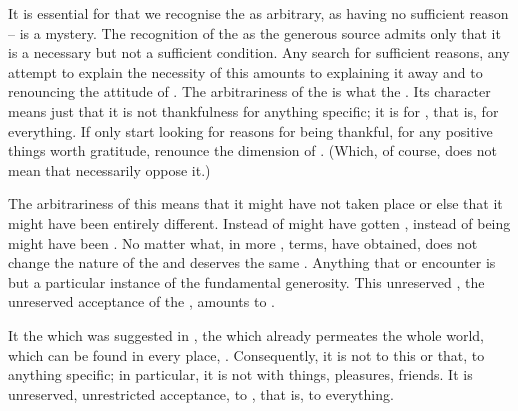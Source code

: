It is essential for  that we recognise
the  as arbitrary, as having no sufficient reason --
 is a mystery.  The recognition of the  as the
generous source admits only that it is a necessary but not a
sufficient condition.  Any search for sufficient reasons, any attempt
to explain the necessity of this  amounts to explaining it
away and to renouncing the attitude of .  The
arbitrariness of the  is what  the . Its  character means just that it
 is not thankfulness for anything specific; it is
 for , that is, for everything.  If only
 start looking for reasons for being thankful, for any positive
things worth gratitude,  renounce the  dimension of
. (Which, of course, does not mean that  necessarily
oppose it.) 

\label{openness} 
The arbitrariness of this  means that
it might have not taken place or else that it might have been entirely
different.  Instead of   might have gotten ,
instead of being   might have been .  No
matter what, in more ,  terms,  have
obtained, does not change the nature of the  and deserves the same
.  Anything that  or encounter is but a particular instance of the fundamental
generosity.  This unreserved , the unreserved acceptance of the
, amounts to . 

It  the  which was suggested in
, the  which already permeates the whole world,
which can be found in every place, .
Consequently, it is not  to this or that, to 
anything specific; in particular, it is not  with 
things,  pleasures,  friends. It is unreserved, unrestricted
acceptance,  to , that is, to everything.



